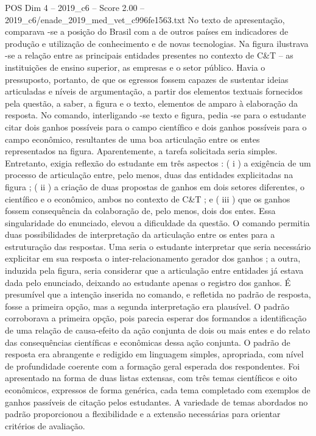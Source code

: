 \begin{textsample}{POS Dim 4 – 2019\_c6 – Score 2.00 – 2019\_c6/enade\_2019\_med\_vet\_c996fe1563.txt}
No texto de apresentação, comparava -se a posição do Brasil com a de outros países em indicadores de produção e utilização de conhecimento e de novas tecnologias.
Na figura ilustrava -se a relação entre as principais entidades presentes no contexto de C\&T – as instituições de ensino superior, as empresas e o setor público.
Havia o pressuposto, portanto, de que os egressos fossem capazes de sustentar ideias articuladas e níveis de argumentação, a partir dos elementos textuais fornecidos pela questão, a saber, a figura e o texto, elementos de amparo à elaboração da resposta.
No comando, interligando -se texto e figura, pedia -se para o estudante citar dois ganhos possíveis para o campo científico e dois ganhos possíveis para o campo econômico, resultantes de uma boa articulação entre os entes representados na figura.
Aparentemente, a tarefa solicitada seria simples.
Entretanto, exigia reflexão do estudante em três aspectos : ( i ) a exigência de um processo de articulação entre, pelo menos, duas das entidades explicitadas na figura ; ( ii ) a criação de duas propostas de ganhos em dois setores diferentes, o científico e o econômico, ambos no contexto de C\&T ; e ( iii ) que os ganhos fossem consequência da colaboração de, pelo menos, dois dos entes.
Essa singularidade do enunciado, elevou a dificuldade da questão.
O comando permitia duas possibilidades de interpretação da articulação entre os entes para a estruturação das respostas.
Uma seria o estudante interpretar que seria necessário explicitar em sua resposta o inter-relacionamento gerador dos ganhos ; a outra, induzida pela figura, seria considerar que a articulação entre entidades já estava dada pelo enunciado, deixando ao estudante apenas o registro dos ganhos.
É presumível que a intenção inserida no comando, e refletida no padrão de resposta, fosse a primeira opção, mas a segunda interpretação era plausível.
O padrão corroborava a primeira opção, pois parecia esperar dos formandos a identificação de uma relação de causa-efeito da ação conjunta de dois ou mais entes e do relato das consequências científicas e econômicas dessa ação conjunta.
O padrão de resposta era abrangente e redigido em linguagem simples, apropriada, com nível de profundidade coerente com a formação geral esperada dos respondentes.
Foi apresentado na forma de duas listas extensas, com três temas científicos e oito econômicos, expressos de forma genérica, cada tema completado com exemplos de ganhos passíveis de citação pelos estudantes.
A variedade de temas abordados no padrão proporcionou a flexibilidade e a extensão necessárias para orientar critérios de avaliação.

\end{textsample}
